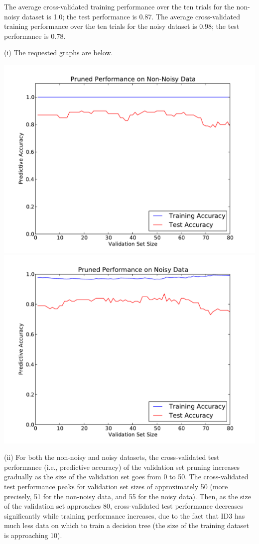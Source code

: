 \documentclass[solution, letterpaper]{cs121}
\begin{document}
\subproblem The average cross-validated training performance over the ten trials for the non-noisy dataset is 1.0; the test performance is 0.87. The average cross-validated training performance over the ten trials for the noisy dataset is 0.98; the test performance is 0.78.
\pagebreak
\subproblem
 
(i) The requested graphs are below. 
\begin{center}
\includegraphics[scale=0.8]{prune-non-noisy.pdf}
\includegraphics[scale=0.8]{prune-noisy.pdf}
\end{center}

(ii) For both the non-noisy and noisy datasets, the cross-validated test performance (i.e., predictive accuracy) of the validation set pruning increases gradually as the size of the validation set goes from 0 to 50. The cross-validated test performance peaks for validation set sizes of approximately 50 (more precisely, 51 for the non-noisy data, and 55 for the noisy data). Then, as the size of the validation set approaches 80, cross-validated test performance decreases significantly while training performance increases, due to the fact that ID3 has much less data on which to train a decision tree (the size of the training dataset is approaching 10). \\
\end{document}
